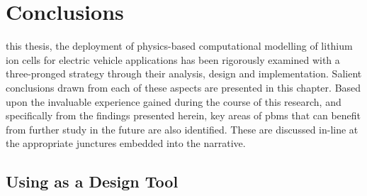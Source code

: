 
\graphicspath{{chapters/litt_review/figures/}}

\clearpage
\chapter{Conclusions}\label{ch:conclusions}
\startcontents[chapters]

\bigskip

 this  thesis, the  deployment of  physics-based computational
modelling  of lithium  ion  cells  for electric  vehicle  applications has  been
rigorously examined with a three-pronged strategy \viz{} through their analysis,
design and implementation. Salient conclusions  drawn from each of these aspects
are  presented in  this chapter.  Based  upon the  invaluable experience  gained
during the course of this research, and specifically from the findings presented
herein, key  areas of  \glspl{pbm} that  can benefit from  further study  in the
future  are also  identified. These  are  discussed in-line  at the  appropriate
junctures embedded into the narrative.

\section{Using  as a Design Tool}




